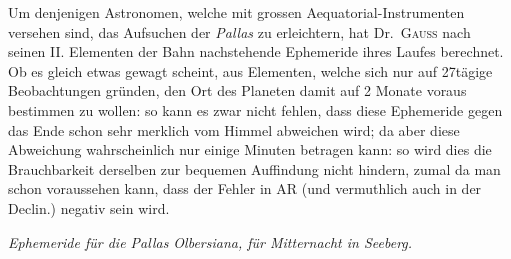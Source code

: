 Um denjenigen Astronomen, welche mit grossen Aequatorial-Instrumenten versehen sind, das Aufsuchen der \textit{Pallas} zu erleichtern, hat Dr.\ \textsc{Gauss} nach seinen II. Elementen der Bahn nachstehende Ephemeride ihres Laufes berechnet. Ob es gleich etwas gewagt scheint, aus Elementen, welche sich nur auf 27tägige Beobachtungen gründen, den Ort des Planeten damit auf 2 Monate voraus bestimmen zu wollen: so kann es zwar nicht fehlen, dass diese Ephemeride gegen das Ende schon sehr merklich vom Himmel abweichen wird; da aber diese Abweichung wahrscheinlich nur einige Minuten betragen kann: so wird dies die Brauchbarkeit derselben zur bequemen Auffindung nicht hindern, zumal da man schon voraussehen kann, dass der Fehler in AR (und vermuthlich auch in der Declin.) negativ sein wird.
\begin{center}
\textit{Ephemeride für die Pallas Olbersiana, für Mitternacht in Seeberg.}\par\medskip
\end{center}
\begin{center}\begingroup\fontsize{9}{11}\selectfont\setlength{\tabcolsep}{2.5pt}
%
\ifdim\wd0>\linewidth\resizebox{\linewidth}{!}{\usebox{0}}\else\usebox{0}\fi
\endgroup\end{center}
\begin{flushright}\end{flushright}

